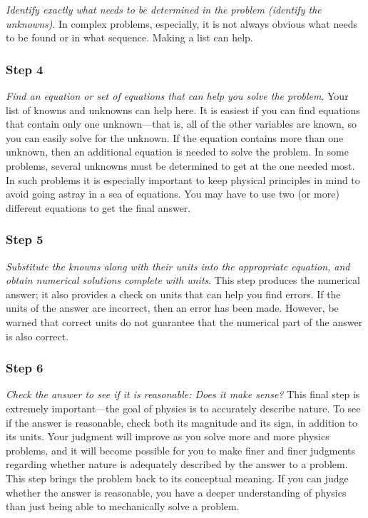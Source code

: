 \documentclass[
]{book}
\begin{document}
\emph{Identify exactly what needs to be determined in the problem (identify
the unknowns)}. In complex problems, especially, it is not always
obvious what needs to be found or in what sequence. Making a list can
help.

\hypertarget{fs-id758749}{}
\hypertarget{step-4}{%
\subsubsection{Step 4}\label{step-4}}

\emph{Find an equation or set of equations that can help you solve the
problem}. Your list of knowns and unknowns can help here. It is easiest
if you can find equations that contain only one unknown---that is, all
of the other variables are known, so you can easily solve for the
unknown. If the equation contains more than one unknown, then an
additional equation is needed to solve the problem. In some problems,
several unknowns must be determined to get at the one needed most. In
such problems it is especially important to keep physical principles in
mind to avoid going astray in a sea of equations. You may have to use
two (or more) different equations to get the final answer.

\hypertarget{fs-id1770068}{}
\hypertarget{step-5}{%
\subsubsection{Step 5}\label{step-5}}

\emph{Substitute the knowns along with their units into the appropriate
equation, and obtain numerical solutions complete with units}. This step
produces the numerical answer; it also provides a check on units that
can help you find errors. If the units of the answer are incorrect, then
an error has been made. However, be warned that correct units do not
guarantee that the numerical part of the answer is also correct.

\hypertarget{fs-id1372026}{}
\hypertarget{step-6}{%
\subsubsection{Step 6}\label{step-6}}

\emph{Check the answer to see if it is reasonable: Does it make sense?} This
final step is extremely important---the goal of physics is to accurately
describe nature. To see if the answer is reasonable, check both its
magnitude and its sign, in addition to its units. Your judgment will
improve as you solve more and more physics problems, and it will become
possible for you to make finer and finer judgments regarding whether
nature is adequately described by the answer to a problem. This step
brings the problem back to its conceptual meaning. If you can judge
whether the answer is reasonable, you have a deeper understanding of
physics than just being able to mechanically solve a problem.
\end{document}
